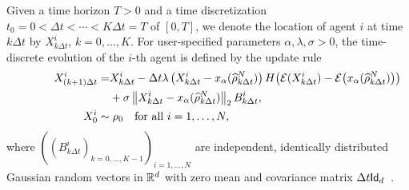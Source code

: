 \documentclass[a4paper, 11pt]{article}
\newcommand{\cutoff}[1]{H\!\left({#1}\right)}
\newcommand{\conspoint}[1]{x_{\alpha}({#1})}
\newcommand{\empmeasure}[1]{\widehat\rho_{#1}^N}
\begin{document}
Given a time horizon $T > 0$ and a time discretization $t_0 = 0 < \Delta t < \!\cdots< K \Delta t = T$ of $[0,T]$, we denote the location of agent $i$ at time $k\Delta t$ by $X^i_{k\Delta t}$, $k=0,\ldots,K$. For user-specified parameters
$\alpha,\lambda,\sigma > 0$, the time-discrete evolution of
the $i$-th agent is defined by the update rule
\begin{alignat}{2} \label{cbo:dynamic}
    \phantom{X_{(k+1)\Delta t}^i - X_{k\Delta t}^i} & \begin{aligned}[c]
\mathllap{X_{(k+1)\Delta t}^i} = & X_{k\Delta t}^i- \Delta t\lambda\left( X_{k\Delta t}^i - \conspoint{\empmeasure{k\Delta t}}\right)\cutoff{\CE( X_{k\Delta t}^i)-\CE\!\left(\conspoint{\empmeasure{k\Delta t}}\right)} \\
& + \sigma \N{ X_{k\Delta t}^i-\conspoint{\empmeasure{k\Delta t}}}_2  B_{k\Delta t}^i,\\
\end{aligned} \\
    \mathllap{X_0^i}& \sim \rho_0 \quad \text{for all } i =1,\ldots,N, \label{qcbo:initial}
\end{alignat}
where $(( B_{k\Delta t}^i)_{k=0,\ldots,K-1})_{i=1,\ldots,N}$ are independent, identically distributed Gaussian random vectors in $\mathbb{R}^d$ with zero mean and covariance matrix $\Delta t \mathsf{Id}_d$~\cite{fornasier2021consensus}.
\end{document}
